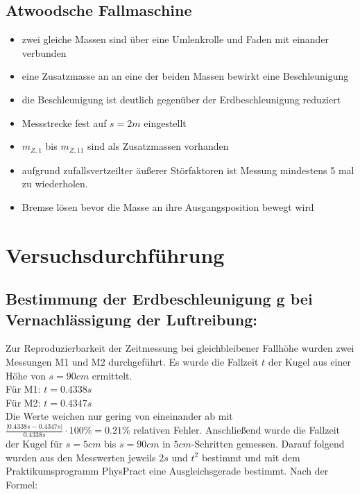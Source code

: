 \documentclass{protokoll}
\begin{document}
\subsection{Atwoodsche Fallmaschine}
\begin{itemize}

\item zwei gleiche Massen sind über eine Umlenkrolle und Faden mit einander
verbunden
\item eine Zusatzmasse an an eine der beiden Massen bewirkt eine Beschleunigung
\item die Beschleunigung ist deutlich gegenüber der Erdbeschleunigung reduziert
\item Messstrecke fest auf $s = 2m $ eingestellt
\item $m_{Z,1}$ bis $m_{Z,11}$ sind als Zusatzmassen vorhanden
\item aufgrund zufallsvertzeilter äußerer Störfaktoren ist Messung 
mindestens 5 mal zu wiederholen.
\item Bremse lösen bevor die Masse an ihre Ausgangsposition bewegt wird

\end{itemize}


\section{Versuchsdurchführung}




\subsection{Bestimmung der Erdbeschleunigung g bei Vernachlässigung der Luftreibung:}



Zur Reproduzierbarkeit der Zeitmessung bei gleichbleibener Fallhöhe wurden zwei Messungen M1 und M2 durchgeführt.
Es wurde die Fallzeit $t$ der Kugel aus einer Höhe von $s = 90cm$ ermittelt. \\
Für M1: $t = 0.4338s$ \\
Für M2: $t = 0.4347s$ \\
Die Werte weichen nur gering von eineinander ab mit 
$\frac{|0.4338s - 0.4347s|}{0.4338s}\cdot 100 \% = 0.21 \%$ relativen Fehler.
Anschließend wurde die Fallzeit der Kugel für $s = 5cm$ bis $s = 90cm$ in $5cm$-Schritten gemessen.
Darauf folgend wurden aus den Messwerten jeweils $2s$ und $t^2$ bestimmt und mit dem
Praktikumsprogramm PhysPract eine Ausgleichsgerade bestimmt.
Nach der Formel:
\end{document}
